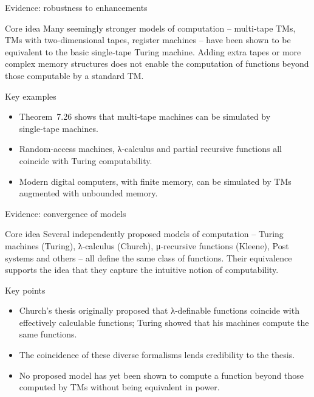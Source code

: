 \begin{frame}[t]{Evidence: robustness to enhancements}
  \begin{tblock}{Core idea}
    Many seemingly stronger models of computation – multi‑tape TMs,
    TMs with two‑dimensional tapes, register machines – have been
    shown to be equivalent to the basic single‑tape Turing machine.
    Adding extra tapes or more complex memory structures does not
    enable the computation of functions beyond those computable by a
    standard TM.
  \end{tblock}
  \begin{tblock}{Key examples}
    \begin{itemize}
      \item Theorem 7.26 shows that multi‑tape machines can be
        simulated by single‑tape machines.
      \item Random‑access machines, λ‑calculus and partial recursive
        functions all coincide with Turing computability.
      \item Modern digital computers, with finite memory, can be
        simulated by TMs augmented with unbounded memory.
    \end{itemize}
  \end{tblock}
  \label{fr:7.6-03}
\end{frame}

\begin{frame}[t]{Evidence: convergence of models}
  \begin{tblock}{Core idea}
    Several independently proposed models of computation – Turing
    machines (Turing), λ‑calculus (Church), μ‑recursive functions
    (Kleene), Post systems and others – all define the same class of
    functions.  Their equivalence supports the idea that they capture
    the intuitive notion of computability.
  \end{tblock}
  \begin{tblock}{Key points}
    \begin{itemize}
      \item Church’s thesis originally proposed that λ‑definable
        functions coincide with effectively calculable functions; Turing
        showed that his machines compute the same functions.
      \item The coincidence of these diverse formalisms lends
        credibility to the thesis.
      \item No proposed model has yet been shown to compute a
        function beyond those computed by TMs without being
        equivalent in power.
    \end{itemize}
  \end{tblock}
  \label{fr:7.6-04}
\end{frame}

